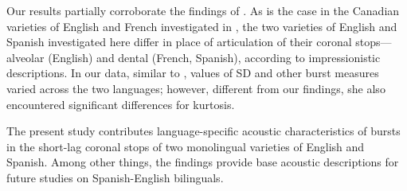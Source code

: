 \documentclass[a4paper,11pt,twocolumn]{article}
\begin{document}
Our results partially corroborate the findings of \cite{sundara2005acoustic}. As is the case in the Canadian varieties of English and French investigated in \cite{sundara2005acoustic}, the two varieties of English and Spanish investigated here differ in place of articulation of their coronal stops---alveolar (English) and dental (French, Spanish), according to impressionistic descriptions. In our data, similar to \cite{sundara2005acoustic}, values of SD and other burst measures varied across the two languages; however, different from our findings, she also encountered significant differences for kurtosis.

The present study contributes language-specific acoustic characteristics of bursts in the short-lag coronal stops of two monolingual varieties of English and Spanish. Among other things, the findings provide base acoustic descriptions for future studies on Spanish-English bilinguals.

\newpage




\theendnotes
\end{document}
